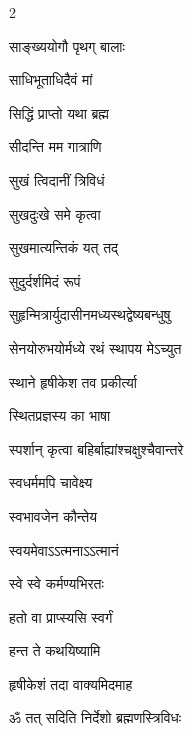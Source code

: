 \begin{multicols}{2}
\begin{indexlist}
\item साङ्ख्ययोगौ पृथग् बालाः \dotfill {}
\item साधिभूताधिदैवं मां \dotfill {}
\item सिद्धिं प्राप्तो यथा ब्रह्म \dotfill {}
\item सीदन्ति मम गात्राणि \dotfill {}
\item सुखं त्विदानीं त्रिविधं \dotfill {}
\item सुखदुःखे समे कृत्वा \dotfill {}
\item सुखमात्यन्तिकं यत् तद् \dotfill {}
\item सुदुर्दर्शमिदं रूपं \dotfill {}
\item सुहृन्मित्रार्युदासीनमध्यस्थद्वेष्यबन्धुषु \dotfill {}
\item सेनयोरुभयोर्मध्ये रथं स्थापय मेऽच्युत \dotfill {}
\item स्थाने हृषीकेश तव प्रकीर्त्या \dotfill {}
\item स्थितप्रज्ञस्य का भाषा \dotfill {}
\item स्पर्शान् कृत्वा बहिर्बाह्यांश्चक्षुश्चैवान्तरे \dotfill {}
\item स्वधर्ममपि चावेक्ष्य \dotfill {}
\item स्वभावजेन कौन्तेय \dotfill {}
\item स्वयमेवाऽऽत्मनाऽऽत्मानं \dotfill {}
\item स्वे स्वे कर्मण्यभिरतः \dotfill {}
\end{indexlist}

\begin{indexlist}
\item हतो वा प्राप्स्यसि स्वर्गं \dotfill {}
\item हन्त ते कथयिष्यामि \dotfill {}
\item हृषीकेशं तदा वाक्यमिदमाह \dotfill {}
\end{indexlist}

\begin{indexlist}
\item ॐ तत् सदिति निर्देशो ब्रह्मणस्त्रिविधः \dotfill {}
\end{indexlist}
\end{multicols}
